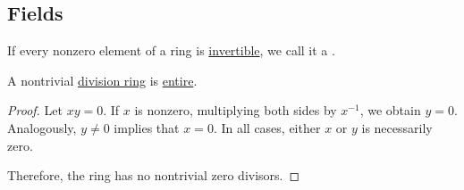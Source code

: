 \subsection{Fields}\label{subsec:fields}

\begin{definition}\label{def:division_ring}
  If every nonzero element of a ring is \hyperref[def:divisibility/unit]{invertible}, we call it a .
\end{definition}

\begin{proposition}\label{thm:division_ring_is_entire}
  A nontrivial \hyperref[def:division_ring]{division ring} is \hyperref[def:entire_semiring]{entire}.
\end{proposition}
\begin{proof}
  Let \( xy = 0 \). If \( x \) is nonzero, multiplying both sides by \( x^{-1} \), we obtain \( y = 0 \). Analogously, \( y \neq 0 \) implies that \( x = 0 \). In all cases, either \( x \) or \( y \) is necessarily zero.

  Therefore, the ring has no nontrivial zero divisors.
\end{proof}

